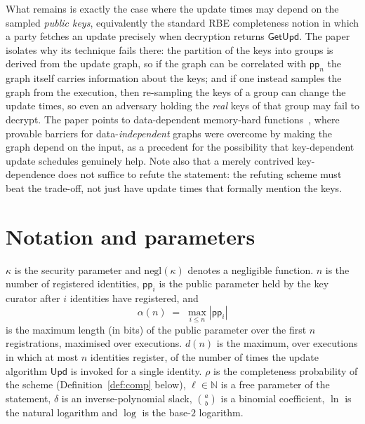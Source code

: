 \documentclass{aicr-conjecture}
\newcommand{\Upd}{\mathsf{Upd}}
\newcommand{\pp}{\mathsf{pp}}
\newcommand{\GetUpd}{\mathsf{GetUpd}}
\newcommand{\negl}{\mathrm{negl}}
\newcommand{\Nat}{\mathbb{N}}
\begin{document}
What remains is exactly the case where the update times may depend on
the sampled \emph{public keys}, equivalently the standard RBE
completeness notion in which a party fetches an update precisely when
decryption returns $\GetUpd$. The paper isolates why its technique fails
there: the partition of the keys into groups is derived from the update
graph, so if the graph can be correlated with $\pp_n$ the graph itself
carries information about the keys; and if one instead samples the graph
from the execution, then re-sampling the keys of a group can change the
update times, so even an adversary holding the \emph{real} keys of that
group may fail to decrypt. The paper points to data-dependent
memory-hard functions~\cite{BH22}, where provable barriers for
data-\emph{independent} graphs were overcome by making the graph depend
on the input, as a precedent for the possibility that key-dependent
update schedules genuinely help. Note also that a merely contrived
key-dependence does not suffice to refute the statement: the refuting
scheme must beat the trade-off, not just have update times that formally
mention the keys.

\section{Notation and parameters}\label{sec:notation}

\noindent
$\kappa$ is the security parameter and $\negl(\kappa)$ denotes a
negligible function. $n$ is the number of registered identities, $\pp_i$
is the public parameter held by the key curator after $i$ identities
have registered, and
\[
\alpha(n) \;=\; \max_{i \le n} |\pp_i|
\]
is the maximum length (in bits) of the public parameter over the first
$n$ registrations, maximised over executions. $d(n)$ is the maximum,
over executions in which at most $n$ identities register, of the number
of times the update algorithm $\Upd$ is invoked for a single identity.
$\rho$ is the completeness probability of the scheme
(Definition~\ref{def:comp} below), $\ell \in \Nat$ is a free parameter
of the statement, $\delta$ is an inverse-polynomial slack,
$\binom{a}{b}$ is a binomial coefficient, $\ln$ is the natural logarithm
and $\log$ is the base-$2$ logarithm.
\end{document}
